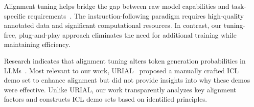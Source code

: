



Alignment tuning helps bridge the gap between raw model capabilities and task-specific requirements~\citep{shneiderman2020bridging,shen2023large,wang2023aligning,DBLP:conf/iclr/Qi0XC0M024}. The instruction-following paradigm\citep{ouyang2022training,sun2023aligning,DBLP:conf/iclr/DaiPSJXL0024,rafailov2024direct,zhou2024lima,wu2024self} requires high-quality annotated data and significant computational resources. In contrast, our tuning-free, plug-and-play approach eliminates the need for additional training while maintaining efficiency.

Research indicates that alignment tuning alters token generation probabilities in LLMs~\citep{DBLP:conf/iclr/LinRLDSCB024, DBLP:journals/corr/abs-2406-05946, DBLP:journals/corr/abs-2407-09121, huang2024safealigner}. Most relevant to our work, URIAL~\citep{DBLP:conf/iclr/LinRLDSCB024} proposed a manually crafted ICL demo set to enhance alignment but did not provide insights into why these demos were effective. Unlike URIAL, our work transparently analyzes key alignment factors and constructs ICL demo sets based on identified principles.